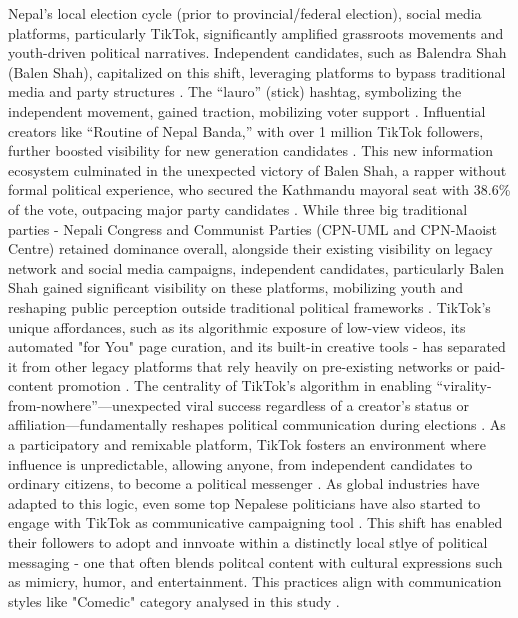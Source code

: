 \documentclass[12pt,a4paper]{report}
\begin{document}
Nepal's local election cycle (prior to provincial/federal election), social media platforms, particularly TikTok, significantly amplified grassroots movements and youth-driven political narratives. Independent candidates, such as Balendra Shah (Balen Shah), capitalized on this shift, leveraging platforms to bypass traditional media and party structures \parencite{DW2022NepalElections}. The ``lauro'' (stick) hashtag, symbolizing the independent movement, gained traction, mobilizing voter support \parencite{AnnapurnaExpress2022}. Influential creators like ``Routine of Nepal Banda,'' with over 1 million TikTok followers, further boosted visibility for new generation candidates \parencite{dahal2023influence}. This new information ecosystem culminated in the unexpected victory of Balen Shah, a rapper without formal political experience, who secured the Kathmandu mayoral seat with 38.6\% of the vote, outpacing major party candidates \parencite{wikipedia2022local}. While three big traditional parties - Nepali Congress and Communist Parties (CPN-UML and CPN-Maoist Centre) retained dominance overall, alongside their existing visibility on legacy network and social media campaigns, independent candidates, particularly  Balen Shah gained significant visibility on these platforms, mobilizing youth and reshaping public perception outside traditional political frameworks \parencite{DW2022NepalElections}.
\newpage
TikTok's unique affordances, such as its algorithmic exposure of low-view videos, its automated "for You" page curation, and its built-in creative tools - has separated it from other legacy platforms that rely heavily on pre-existing networks or paid-content promotion \parencite{guinaudeau2022fifteen}. The centrality of TikTok’s algorithm in enabling ``virality-from-nowhere''—unexpected viral success regardless of a creator’s status or affiliation—fundamentally reshapes political communication during elections \parencite{guinaudeau2022fifteen}. As a participatory and remixable platform, TikTok fosters an environment where influence is unpredictable, allowing anyone, from independent candidates to ordinary citizens, to become a political messenger \parencite{guinaudeau2022fifteen}. As global industries have adapted to this logic, even some top Nepalese politicians have also started to engage with TikTok as communicative campaigning tool \parencite{himalayantimes2025oli}. This shift has enabled their followers to adopt and innvoate within a distinctly local stlye of political  messaging - one that often blends politcal content with cultural expressions such as mimicry, humor, and entertainment. This practices align with communication styles like "Comedic" category analysed in this study \parencite{umansky2023dances}. 
\end{document}
